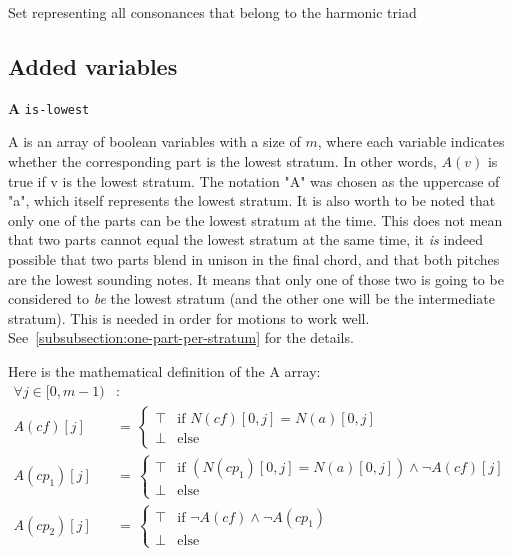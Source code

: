 Set representing all consonances that belong to the harmonic triad

\subsection{Added variables}
\vspace{.5cm} \noindent \textbf{A} \hspace{.cm} \texttt{is-lowest} \label{is-lowest}

A is an array of boolean variables with a size of $m$, where each variable indicates whether the corresponding part is the lowest stratum. In other words, $A(v)$ is true if v is the lowest stratum. The notation "A" was chosen as the uppercase of "a", which itself represents the lowest stratum. 
It is also worth to be noted that only one of the parts can be the lowest stratum at the time. This does not mean that two parts cannot equal the lowest stratum at the same time, it \textit{is} indeed possible that two parts blend in unison in the final chord, and that both pitches are the lowest sounding notes. It means that only one of those two is going to be considered to \textit{be} the lowest stratum (and the other one will be the intermediate stratum). This is needed in order for motions to work well. See~\ref{subsubsection:one-part-per-stratum} for the details.

Here is the mathematical definition of the A array:
\begin{equation}
\begin{aligned}
\forall j \in [0, m-1)& \colon  \\
A(cf)[j] &= \,  
\begin{cases}
    \top & \text{if } N(cf)[0,j] = N(a)[0,j] \\
    \bot & \text{else }
\end{cases}\\
A(cp_1)[j] &= \,  
\begin{cases}
    \top & \text{if } (N(cp_1)[0,j] = N(a)[0,j]) \land \neg A(cf)[j] \\
    \bot & \text{else }
\end{cases}\\
A(cp_2)[j] &= \,  
\begin{cases}
    \top & \text{if } \neg A(cf) \land \neg A(cp_1)\\
    \bot & \text{else }
\end{cases}
\end{aligned}
\end{equation}

